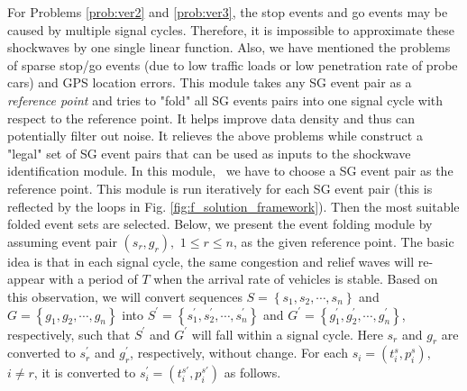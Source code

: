 \documentclass[final,oneside,onecolumn,12pt,a4paper]{book}%
\begin{document}
For Problems \ref{prob:ver2} and \ref{prob:ver3}, the stop events and go
events may be caused by multiple signal cycles. Therefore, it is impossible to
approximate these shockwaves by one single linear function. Also, we have
mentioned the problems of sparse stop/go events (due to low traffic loads or
low penetration rate of probe cars) and GPS location errors. This module takes
any SG event pair as a \emph{reference point} and tries to "fold" all SG
events pairs into one signal cycle with respect to the reference point. It
helps improve data density and thus can potentially filter out noise. It
relieves the above problems while construct a "legal" set of SG event pairs
that can be used as inputs to the shockwave identification module. In this
module, \ we have to choose a SG event pair as the reference point. This
module is run iteratively for each SG event pair (this is reflected by the
loops in Fig. \ref{fig:f_solution_framework}). Then the most suitable folded
event sets are selected. Below, we present the event folding module by
assuming event pair $\left(  s_{r},g_{r}\right)  ,$ $1\leq r\leq n$, as the
given reference point. The basic idea is that in each signal cycle, the same
congestion and relief waves will re-appear with a period of $T$ when the
arrival rate of vehicles is stable. Based on this observation, we will convert
sequences $S=\left\{  s_{1},s_{2},\cdots,s_{n}\right\}  $ and $G=\left\{
g_{1},g_{2},\cdots,g_{n}\right\}  $ into $S^{\prime}=\left\{  s_{1}^{\prime
},s_{2}^{\prime},\cdots,s_{n}^{\prime}\right\}  $ and $G^{\prime}=\left\{
g_{1}^{\prime},g_{2}^{\prime},\cdots,g_{n}^{\prime}\right\}  $, respectively,
such that $S^{\prime}$ and $G^{\prime}$ will fall within a signal cycle. Here
$s_{r}$ and $g_{r}$ are converted to $s_{r}^{\prime}$ and $g_{r}^{\prime}$,
respectively, without change. For each $s_{i}=\left(  t_{i}^{s},p_{i}%
^{s}\right)  ,$ $i\neq r$, it is converted to $s_{i}^{\prime}=\left(
t_{i}^{s\prime},p_{i}^{s\prime}\right)  $ as follows.
\end{document}
